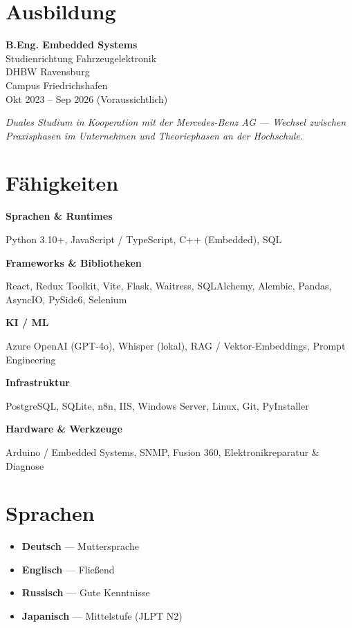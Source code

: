 \documentclass[10pt, a4paper]{article}
\newcommand{\skill}[2]{%
  \textbf{#1}\\[0.15em]
  {\raggedright #2\par}
}
\begin{document}
\begin{minipage}[t]{0.32\linewidth}

\section{Ausbildung}

\textbf{B.Eng. Embedded Systems}\\
\textcolor{subtle}{\small Studienrichtung Fahrzeugelektronik}\\
\textcolor{subtle}{\small DHBW Ravensburg}\\
\textcolor{subtle}{\small Campus Friedrichshafen}\\
\textcolor{subtle}{\small Okt 2023 – Sep 2026 (Voraussichtlich)}

\vspace{0.5em}

\textit{\footnotesize\textcolor{subtle}{Duales Studium in Kooperation mit der Mercedes-Benz AG — Wechsel zwischen Praxisphasen im Unternehmen und Theoriephasen an der Hochschule.}}

\vspace{0.5em}

\section{Fähigkeiten}

\skill{Sprachen \& Runtimes}{Python 3.10+, JavaScript / TypeScript, C++ (Embedded), SQL}

\vspace{0.4em}
\skill{Frameworks \& Bibliotheken}{React, Redux Toolkit, Vite, Flask, Waitress, SQLAlchemy, Alembic, Pandas, AsyncIO, PySide6, Selenium}

\vspace{0.4em}
\skill{KI / ML}{Azure OpenAI (GPT-4o), Whisper (lokal), RAG / Vektor-Embeddings, Prompt Engineering}

\vspace{0.4em}
\skill{Infrastruktur}{PostgreSQL, SQLite, n8n, IIS, Windows Server, Linux, Git, PyInstaller}

\vspace{0.4em}
\skill{Hardware \& Werkzeuge}{Arduino / Embedded Systems, SNMP, Fusion 360, Elektronikreparatur \& Diagnose}

\section{Sprachen}

\begin{itemize}[leftmargin=0.8em]
  \item \textbf{Deutsch} — Muttersprache
  \item \textbf{Englisch} — Fließend
  \item \textbf{Russisch} — Gute Kenntnisse
  \item \textbf{Japanisch} — Mittelstufe (JLPT N2)
\end{itemize}

\end{minipage}
\end{document}
